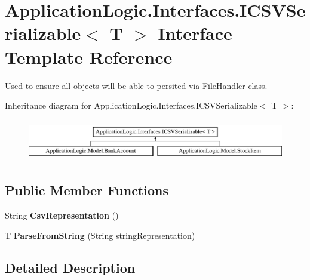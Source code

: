 \hypertarget{interface_application_logic_1_1_interfaces_1_1_i_c_s_v_serializable-g}{
\section{ApplicationLogic.Interfaces.ICSVSerializable$<$ T $>$ Interface Template Reference}
\label{interface_application_logic_1_1_interfaces_1_1_i_c_s_v_serializable-g}
}


Used to ensure all objects will be able to persited via \hyperlink{class_application_logic_1_1_file_handler-g}{FileHandler} class.  


Inheritance diagram for ApplicationLogic.Interfaces.ICSVSerializable$<$ T $>$:\begin{figure}[H]
\begin{center}
\leavevmode
\includegraphics[height=1.842105cm]{interface_application_logic_1_1_interfaces_1_1_i_c_s_v_serializable-g}
\end{center}
\end{figure}
\subsection*{Public Member Functions}
\begin{DoxyCompactItemize}
\item 
\hypertarget{interface_application_logic_1_1_interfaces_1_1_i_c_s_v_serializable-g_aadc9560f5fae4389039946ae3934489a}{
String {\bfseries CsvRepresentation} ()}
\label{interface_application_logic_1_1_interfaces_1_1_i_c_s_v_serializable-g_aadc9560f5fae4389039946ae3934489a}

\item 
\hypertarget{interface_application_logic_1_1_interfaces_1_1_i_c_s_v_serializable-g_acadda3cd0218e076c7b02295d0d9c25a}{
T {\bfseries ParseFromString} (String stringRepresentation)}
\label{interface_application_logic_1_1_interfaces_1_1_i_c_s_v_serializable-g_acadda3cd0218e076c7b02295d0d9c25a}

\end{DoxyCompactItemize}


\subsection{Detailed Description}
